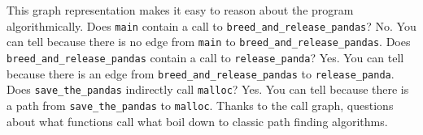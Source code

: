 \begin{sloppypar}
This graph representation makes it easy to reason about the program algorithmically.  Does \lstinline{main} contain a call to \lstinline{breed_and_release_pandas}?  No.  You can tell because there is no edge from \lstinline{main} to \lstinline{breed_and_release_pandas}.  Does \lstinline{breed_and_release_pandas} contain a call to \lstinline{release_panda}?  Yes.  You can tell because there is an edge from \lstinline{breed_and_release_pandas} to \lstinline{release_panda}.  Does \lstinline{save_the_pandas} indirectly call \lstinline{malloc}?  Yes.  You can tell because there is a path from \lstinline{save_the_pandas} to \lstinline{malloc}.  Thanks to the call graph, questions about what functions call what boil down to classic path finding algorithms.  
\end{sloppypar}
